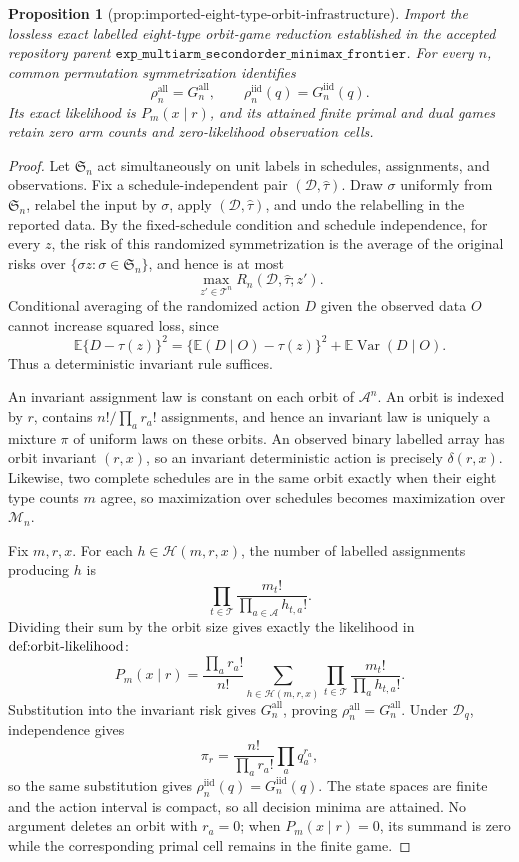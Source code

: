 \documentclass{article}
\newtheorem{proposition}{Proposition}
\begin{document}
\begin{proposition}[prop:imported-eight-type-orbit-infrastructure]\label{prop:imported-eight-type-orbit-infrastructure}
Import the lossless exact labelled eight-type orbit-game reduction established in the accepted repository parent \(\texttt{exp\_multiarm\_secondorder\_minimax\_frontier}\). For every \(n\), common permutation symmetrization identifies \[\rho_n^{\mathrm{all}}=G_n^{\mathrm{all}},\qquad \rho_n^{\mathrm{iid}}(q)=G_n^{\mathrm{iid}}(q).\] Its exact likelihood is \(P_m(x\mid r)\), and its attained finite primal and dual games retain zero arm counts and zero-likelihood observation cells.
\end{proposition}
\begin{proof}
Let \(\mathfrak S_n\) act simultaneously on unit labels in schedules, assignments, and observations.  Fix a schedule-independent pair \((\mathcal D,\widehat\tau)\).  Draw \(\sigma\) uniformly from \(\mathfrak S_n\), relabel the input by \(\sigma\), apply \((\mathcal D,\widehat\tau)\), and undo the relabelling in the reported data.  By the fixed-schedule condition and schedule independence, for every \(z\), the risk of this randomized symmetrization is the average of the original risks over \(\{\sigma z:\sigma\in\mathfrak S_n\}\), and hence is at most
\[
\max_{z'\in\mathcal T^n}R_n(\mathcal D,\widehat\tau;z').
\]
Conditional averaging of the randomized action \(D\) given the observed data \(O\) cannot increase squared loss, since
\[
\mathbb E\{D-\tau(z)\}^2
=\{\mathbb E(D\mid O)-\tau(z)\}^2+\mathbb E\operatorname{Var}(D\mid O).
\]
Thus a deterministic invariant rule suffices.

An invariant assignment law is constant on each orbit of \(\mathcal A^n\).  An orbit is indexed by \(r\), contains \(n!/\prod_a r_a!\) assignments, and hence an invariant law is uniquely a mixture \(\pi\) of uniform laws on these orbits.  An observed binary labelled array has orbit invariant \((r,x)\), so an invariant deterministic action is precisely \(\delta(r,x)\).  Likewise, two complete schedules are in the same orbit exactly when their eight type counts \(m\) agree, so maximization over schedules becomes maximization over \(\mathcal M_n\).

Fix \(m,r,x\).  For each \(h\in\mathcal H(m,r,x)\), the number of labelled assignments producing \(h\) is
\[
\prod_{t\in\mathcal T}\frac{m_t!}{\prod_{a\in\mathcal A}h_{t,a}!}.
\]
Dividing their sum by the orbit size gives exactly the likelihood in \(\textnormal{def:orbit-likelihood}\):
\[
P_m(x\mid r)=\frac{\prod_a r_a!}{n!}
\sum_{h\in\mathcal H(m,r,x)}
\prod_{t\in\mathcal T}\frac{m_t!}{\prod_a h_{t,a}!}.
\]
Substitution into the invariant risk gives \(G_n^{\mathrm{all}}\), proving \(\rho_n^{\mathrm{all}}=G_n^{\mathrm{all}}\).  Under \(\mathcal D_q\), independence gives
\[
\pi_r=\frac{n!}{\prod_a r_a!}\prod_aq_a^{r_a},
\]
so the same substitution gives \(\rho_n^{\mathrm{iid}}(q)=G_n^{\mathrm{iid}}(q)\).  The state spaces are finite and the action interval is compact, so all decision minima are attained.  No argument deletes an orbit with \(r_a=0\); when \(P_m(x\mid r)=0\), its summand is zero while the corresponding primal cell remains in the finite game.
\end{proof}
\end{document}
